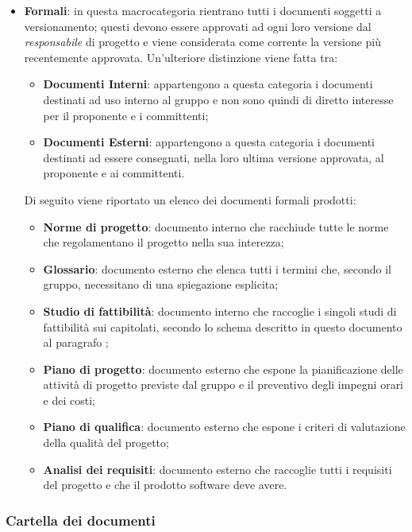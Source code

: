 \begin{itemize}
    \item \textbf{Formali}: in questa macrocategoria rientrano tutti i documenti soggetti a versionamento; questi devono
    essere approvati ad ogni loro versione dal \emph{responsabile} di progetto e viene considerata come corrente la
    versione più recentemente approvata. Un'ulteriore distinzione viene fatta tra:
    \begin{itemize}
        \item \textbf{Documenti Interni}: appartengono a questa categoria i documenti destinati ad uso interno al
        gruppo e non sono quindi di diretto interesse per il proponente e i committenti;
        \item \textbf{Documenti Esterni}: appartengono a questa categoria i documenti destinati ad essere consegnati,
        nella loro ultima versione approvata, al proponente e ai committenti.
    \end{itemize}
    Di seguito viene riportato un elenco dei documenti formali prodotti:
    \begin{itemize}
        \item \textbf{Norme di progetto}: documento interno che racchiude tutte le norme che regolamentano il progetto
        nella sua interezza;
        \item \textbf{Glossario}: documento esterno che elenca tutti i termini che, secondo il gruppo, necessitano di
        una spiegazione esplicita;
        \item \textbf{Studio di fattibilità}: documento interno che raccoglie i singoli studi di fattibilità sui
        capitolati, secondo lo schema descritto in questo documento al paragrafo ;
        \item \textbf{Piano di progetto}: documento esterno che espone la pianificazione delle attività di progetto
        previste dal gruppo e il preventivo degli impegni orari e dei costi;
        \item \textbf{Piano di qualifica}: documento esterno che espone i criteri di valutazione della qualità del
        progetto;
        \item \textbf{Analisi dei requisiti}: documento esterno che raccoglie tutti i requisiti del progetto e che il
        prodotto software deve avere.
  \end{itemize}

\end{itemize}

\subsubsection{Cartella dei documenti}
\label{ssub:cartella_doc}


